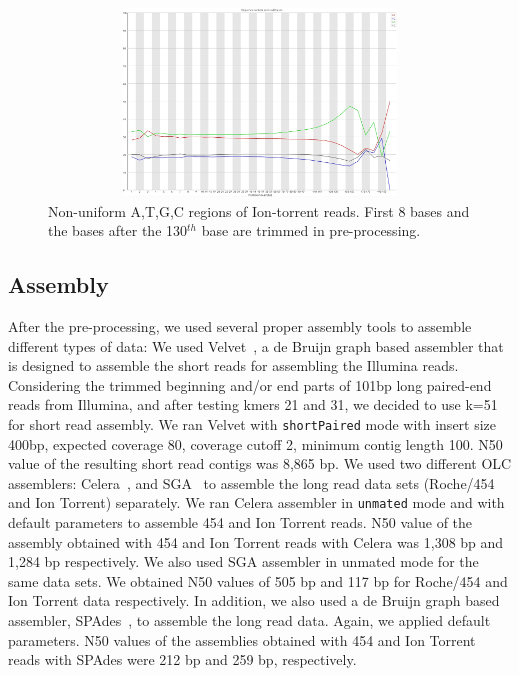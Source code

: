 \documentclass{llncs}
\begin{document}
\begin{figure}[htbp]
\centerline{\includegraphics[width=12cm, height=5cm]{ionTorrentFastqc.png}}
\caption{Non-uniform A,T,G,C regions of Ion-torrent reads. First 8 bases and the bases after the 130$^{th}$ base are trimmed in pre-processing.}
\label{fig:nonuniformATGC}
\end{figure}


\subsection{Assembly} 
After the pre-processing, we used several proper assembly tools to assemble different types of data: We used Velvet~\cite{velvetZerbino:2008}, a de Bruijn graph based assembler that is designed to assemble the short reads for assembling the Illumina reads. Considering the trimmed beginning and/or end parts of 101bp long paired-end reads from Illumina, and after testing kmers 21 and 31, we decided to use k=51 for short read assembly. We ran Velvet with {\tt shortPaired} mode with insert size 400bp, expected coverage 80, coverage cutoff 2, minimum contig length 100. N50 value of the resulting short read contigs was 8,865 bp. We used two different OLC assemblers: Celera~\cite{celera:2000}, and SGA~\cite{sga:2012} to assemble the long read data sets (Roche/454 and Ion Torrent) separately. We ran Celera assembler in {\tt unmated} mode and with default parameters to assemble 454 and Ion Torrent reads. N50 value of the assembly obtained with 454 and Ion Torrent reads with Celera was 1,308 bp and 1,284 bp respectively. We also used SGA assembler in unmated mode for the same data sets. We obtained N50 values of 505 bp and 117 bp for Roche/454 and Ion Torrent data respectively. In addition, we also used a de Bruijn graph based assembler, SPAdes~\cite{spadesBankevich:2012}, to assemble the long read data. Again, we applied default parameters. 
N50 values of the assemblies obtained with 454 and Ion Torrent reads with SPAdes were 212 bp and 259 bp, respectively.
\end{document}
